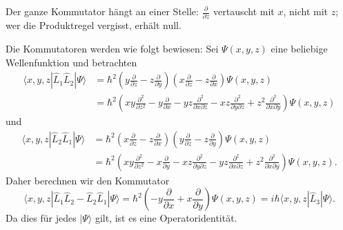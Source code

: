 Der ganze Kommutator hängt an einer Stelle: $\frac{\partial}{\partial z}$ vertauscht mit $x$, nicht mit $z$; wer die Produktregel vergisst, erhält null.

Die Kommutatoren werden wie folgt bewiesen: Sei $\Psi(x,y,z)$ eine beliebige Wellenfunktion und betrachten
\begin{equation}
	\begin{split}
		\langle x,y,z|\widehat{L}_1\widehat{L}_2|\Psi\rangle &= {\hbar}^2 \left(y\frac{\partial}{\partial z} - z\frac{\partial}{\partial y} \right)\left(x\frac{\partial}{\partial z} - z\frac{\partial}{\partial x} \right)\Psi(x,y,z) \\
		&= {\hbar}^2 \left(xy\frac{\partial^2}{\partial z^2} - y\frac{\partial}{\partial x} - yz\frac{\partial^2}{\partial x \partial z} - xz\frac{\partial^2}{\partial y\partial z}  + z^2\frac{\partial^2}{\partial x\partial y} \right)\Psi(x,y,z)
	\end{split}
\end{equation}
und 
\begin{equation}
	\begin{split}
		\langle x,y,z|\widehat{L}_2\widehat{L}_1|\Psi\rangle &= {\hbar}^2 \left(x\frac{\partial}{\partial z} - z\frac{\partial}{\partial x} \right)\left(y\frac{\partial}{\partial z} - z\frac{\partial}{\partial y} \right)\Psi(x,y,z) \\
		&= {\hbar}^2 \left(xy\frac{\partial^2}{\partial z^2} - x\frac{\partial}{\partial y} - xz\frac{\partial^2}{\partial y \partial z} - yz\frac{\partial^2}{\partial x\partial z}  + z^2\frac{\partial^2}{\partial x\partial y} \right)\Psi(x,y,z).
	\end{split}
\end{equation}
Daher berechnen wir den Kommutator
\begin{equation}
	\langle x,y,z|\widehat{L}_1\widehat{L}_2 - \widehat{L}_2\widehat{L}_1|\Psi\rangle = {\hbar}^2 \left(- y\frac{\partial}{\partial x} + x\frac{\partial}{\partial y} \right)\Psi(x,y,z) = i\hbar \langle x,y,z|\widehat{L}_3|\Psi\rangle.
\end{equation}
Da dies für jedes $|\Psi\rangle$ gilt, ist es eine Operatoridentität.

